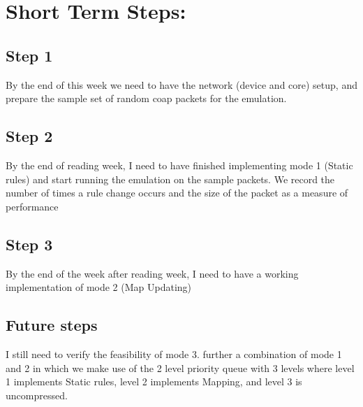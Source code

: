 \documentclass{article}
\numberwithin{equation}{subsection}
\begin{document}
	\newpage
	\section{Short Term Steps:}
	\subsection{Step 1}
	\par{
		By the end of this week we need to have the network (device and core) setup, and prepare the sample set
		of random coap packets for the emulation.
	}

	\subsection{Step 2}
	\par{
	
		By the end of reading week, I need to have finished implementing mode 1 (Static rules) and start running the emulation on the sample packets.
		We record the number of times a rule change occurs and the size of the packet as a measure of performance
	}

	\subsection{Step 3}
	\par{
		By the end of the week after reading week, I need to have a working implementation of mode 2 (Map Updating)
	}

	\subsection{Future steps}
	\par{
		I still need to verify the feasibility of mode 3. further a combination of mode 1 and 2 in which we make use 
		of the 2 level priority queue with 3 levels where level 1 implements Static rules, level 2 implements Mapping, and
		level 3 is uncompressed.
	}

	
\end{document}
